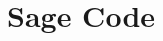 \documentclass[12pt]{article}
\theoremstyle{definition}
\begin{document}
%
%
%
%





\appendix

\section{Sage Code}


\end{document}
